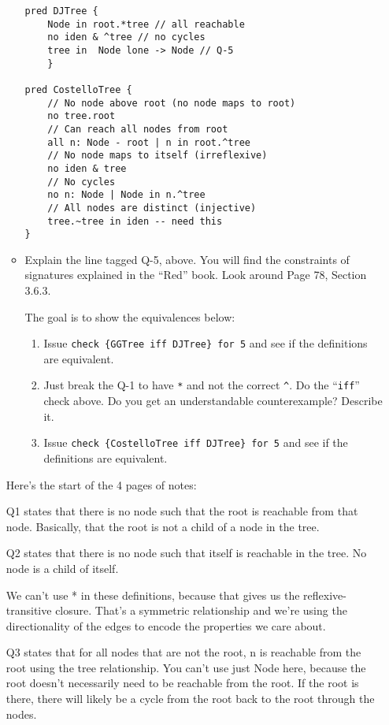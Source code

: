 \documentclass[11pt]{article}
\begin{document}
\begin{enumerate}
\begin{itemize}
\begin{scriptsize}
\begin{verbatim}
pred DJTree {
    Node in root.*tree // all reachable
    no iden & ^tree // no cycles
    tree in  Node lone -> Node // Q-5
    }

pred CostelloTree {
    // No node above root (no node maps to root)
    no tree.root
    // Can reach all nodes from root                
    all n: Node - root | n in root.^tree
    // No node maps to itself (irreflexive) 
    no iden & tree
    // No cycles                    
    no n: Node | Node in n.^tree
    // All nodes are distinct (injective)           
    tree.~tree in iden -- need this
}
\end{verbatim}
\end{scriptsize}

\item[] Explain the line tagged Q-5, above. You will find the constraints of signatures explained
  in the ``Red'' book. Look around Page 78, Section 3.6.3.

The goal is to show the equivalences below:

\begin{enumerate}
\item Issue \verb|check {GGTree iff DJTree} for 5| and see if the definitions are equivalent.

\item Just break the Q-1 to have \verb|*| and not the correct \verb|^|. Do the ``\verb|iff|''  check above.
Do you get an understandable counterexample? Describe it.

\item Issue \verb|check {CostelloTree iff DJTree} for 5| and see if the definitions are equivalent.
\end{enumerate}

\end{itemize}
  
Here's the start of the 4 pages of notes:


Q1 states that there is no node such that the root is reachable from that node. Basically, that the root is not a child of a node in the tree.

Q2 states that there is no node such that itself is reachable in the tree. No node is a child of itself.

We can't use * in these definitions, because that gives us the reflexive-transitive closure. That's a symmetric relationship and we're using the directionality of the edges to encode the properties we care about.

Q3 states that for all nodes that are not the root, n is reachable from the root using the tree relationship. You can't use just Node here, because the root doesn't necessarily need to be reachable from the root. If the root is there, there will likely be a cycle from the root back to the root through the nodes.


\end{enumerate}
\end{document}
